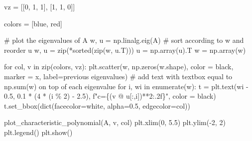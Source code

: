 \documentclass[
  letterpaper,
  DIV=11,
  numbers=noendperiod]{scrartcl}
\newenvironment{Shaded}{\begin{snugshade}}{\end{snugshade}}
\newcommand{\BuiltInTok}[1]{\textcolor[rgb]{0.00,0.23,0.31}{#1}}
\newcommand{\CommentTok}[1]{\textcolor[rgb]{0.37,0.37,0.37}{#1}}
\newcommand{\ControlFlowTok}[1]{\textcolor[rgb]{0.00,0.23,0.31}{#1}}
\newcommand{\DecValTok}[1]{\textcolor[rgb]{0.68,0.00,0.00}{#1}}
\newcommand{\FloatTok}[1]{\textcolor[rgb]{0.68,0.00,0.00}{#1}}
\newcommand{\KeywordTok}[1]{\textcolor[rgb]{0.00,0.23,0.31}{#1}}
\newcommand{\NormalTok}[1]{\textcolor[rgb]{0.00,0.23,0.31}{#1}}
\newcommand{\OperatorTok}[1]{\textcolor[rgb]{0.37,0.37,0.37}{#1}}
\newcommand{\SpecialCharTok}[1]{\textcolor[rgb]{0.37,0.37,0.37}{#1}}
\newcommand{\SpecialStringTok}[1]{\textcolor[rgb]{0.13,0.47,0.30}{#1}}
\newcommand{\StringTok}[1]{\textcolor[rgb]{0.13,0.47,0.30}{#1}}
\theoremstyle{plain}
\theoremstyle{plain}
\theoremstyle{plain}
\theoremstyle{definition}
\theoremstyle{remark}
\begin{document}
\begin{Shaded}
\begin{Highlighting}[]
\NormalTok{vz }\OperatorTok{=}\NormalTok{ [[}\DecValTok{0}\NormalTok{, }\DecValTok{1}\NormalTok{, }\DecValTok{1}\NormalTok{], [}\DecValTok{1}\NormalTok{, }\DecValTok{1}\NormalTok{, }\DecValTok{0}\NormalTok{]]}

\NormalTok{colors }\OperatorTok{=}\NormalTok{ [}\StringTok{\textquotesingle{}blue\textquotesingle{}}\NormalTok{, }\StringTok{\textquotesingle{}red\textquotesingle{}}\NormalTok{]}

\CommentTok{\# plot the eigenvalues of A}
\NormalTok{w, u }\OperatorTok{=}\NormalTok{ np.linalg.eig(A)}
\CommentTok{\# sort according to w and reorder u}
\NormalTok{w, u }\OperatorTok{=} \BuiltInTok{zip}\NormalTok{(}\OperatorTok{*}\BuiltInTok{sorted}\NormalTok{(}\BuiltInTok{zip}\NormalTok{(w, u.T)))}
\NormalTok{u }\OperatorTok{=}\NormalTok{ np.array(u).T}
\NormalTok{w }\OperatorTok{=}\NormalTok{ np.array(w)}

\ControlFlowTok{for}\NormalTok{ col, v }\KeywordTok{in} \BuiltInTok{zip}\NormalTok{(colors, vz):}
\NormalTok{  plt.scatter(w, np.zeros(w.shape), color }\OperatorTok{=} \StringTok{\textquotesingle{}black\textquotesingle{}}\NormalTok{, marker }\OperatorTok{=} \StringTok{\textquotesingle{}x\textquotesingle{}}\NormalTok{, label}\OperatorTok{=}\StringTok{\textquotesingle{}previous eigenvalues\textquotesingle{}}\NormalTok{)}
  \CommentTok{\# add text with textbox equal to np.sum(w) on top of each eigenvalue}
  \ControlFlowTok{for}\NormalTok{ i, wi }\KeywordTok{in} \BuiltInTok{enumerate}\NormalTok{(w):}
\NormalTok{    t }\OperatorTok{=}\NormalTok{ plt.text(wi }\OperatorTok{{-}} \FloatTok{0.5}\NormalTok{, }\FloatTok{0.1} \OperatorTok{*}\NormalTok{ (}\DecValTok{4} \OperatorTok{*}\NormalTok{ (i }\OperatorTok{\%} \DecValTok{2}\NormalTok{) }\OperatorTok{{-}} \FloatTok{2.5}\NormalTok{), }\SpecialStringTok{f"c=}\SpecialCharTok{\{}\NormalTok{(v }\OperatorTok{@}\NormalTok{ u[:,i])}\OperatorTok{**}\DecValTok{2}\SpecialCharTok{:.2f\}}\SpecialStringTok{"}\NormalTok{, color }\OperatorTok{=} \StringTok{\textquotesingle{}black\textquotesingle{}}\NormalTok{)}
\NormalTok{    t.set\_bbox(}\BuiltInTok{dict}\NormalTok{(facecolor}\OperatorTok{=}\StringTok{\textquotesingle{}white\textquotesingle{}}\NormalTok{, alpha}\OperatorTok{=}\FloatTok{0.5}\NormalTok{, edgecolor}\OperatorTok{=}\NormalTok{col))}

\NormalTok{  plot\_characteristic\_polynomial(A, v, col)}
\NormalTok{  plt.xlim(}\DecValTok{0}\NormalTok{, }\FloatTok{5.5}\NormalTok{)}
\NormalTok{  plt.ylim(}\OperatorTok{{-}}\DecValTok{2}\NormalTok{, }\DecValTok{2}\NormalTok{)}
\NormalTok{  plt.legend()}
\NormalTok{  plt.show()}
\end{Highlighting}
\end{Shaded}
\end{document}
